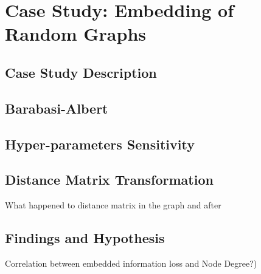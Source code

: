 \chapter{Case Study: Embedding of Random Graphs}\label{chap:2}

\section{Case Study Description}

\section{Barabasi-Albert}
\section{Hyper-parameters Sensitivity}

\section{Distance Matrix Transformation}
What happened to distance matrix in the graph and after



\section{Findings and Hypothesis}
Correlation between embedded information loss and Node Degree?)
